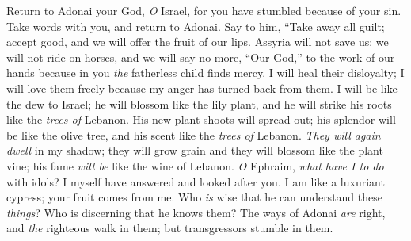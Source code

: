 \begin{biblechapter} %
 Return to Adonai your God, \textit{O} Israel, 
for you have stumbled because of your sin.
\verse Take words with you, 
and return to Adonai. 
Say to him, 
“Take away all guilt; 
accept good, and we will offer 
the fruit of our lips.
\verse Assyria will not save us; 
we will not ride on horses, 
and we will say no more, “Our God,” 
to the work of our hands 
because in you \textit{the} fatherless child finds mercy.
\verse I will heal their disloyalty; 
I will love them freely 
because my anger has turned back 
from them.
\verse I will be like the dew to Israel; 
he will blossom like the lily plant, 
and he will strike his roots like the \textit{trees of} Lebanon.
\verse His new plant shoots will spread out; 
his splendor will be like the olive tree, 
and his scent like the \textit{trees of} Lebanon.
\verse \textit{They will again dwell} in my shadow; 
they will grow grain 
and they will blossom like the plant vine; 
his fame \textit{will be} like the wine of Lebanon.
\verse \textit{O} Ephraim, \textit{what have I to do} with idols? 
I myself have answered and looked after you. 
I am like a luxuriant cypress; 
your fruit comes from me.
\verse Who \textit{is} wise that he can understand these \textit{things}? 
Who is discerning that he knows them? 
The ways of Adonai \textit{are} right, 
and \textit{the} righteous walk in them; 
but transgressors stumble in them.
\end{biblechapter}

